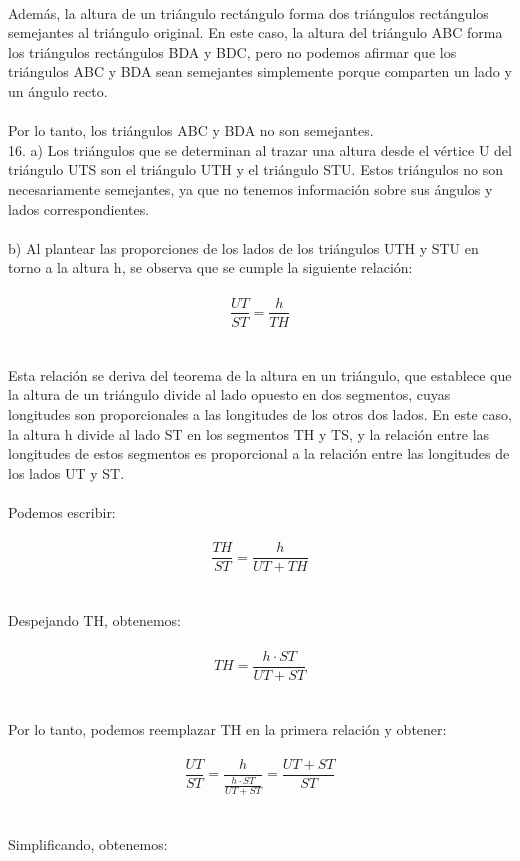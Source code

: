 \documentclass{article}
\begin{document}
\\
Además, la altura de un triángulo rectángulo forma dos triángulos rectángulos semejantes al triángulo original. En este caso, la altura del triángulo ABC forma los triángulos rectángulos BDA y BDC, pero no podemos afirmar que los triángulos ABC y BDA sean semejantes simplemente porque comparten un lado y un ángulo recto.\\
\\
Por lo tanto, los triángulos ABC y BDA no son semejantes.\\
{\Large 16.}
a) Los triángulos que se determinan al trazar una altura desde el vértice U del triángulo UTS son el triángulo UTH y el triángulo STU. Estos triángulos no son necesariamente semejantes, ya que no tenemos información sobre sus ángulos y lados correspondientes.\\
\\
b) Al plantear las proporciones de los lados de los triángulos UTH y STU en torno a la altura h, se observa que se cumple la siguiente relación:\\
\\
$$\frac{UT}{ST} = \frac{h}{TH}$$\\
\\
Esta relación se deriva del teorema de la altura en un triángulo, que establece que la altura de un triángulo divide al lado opuesto en dos segmentos, cuyas longitudes son proporcionales a las longitudes de los otros dos lados. En este caso, la altura h divide al lado ST en los segmentos TH y TS, y la relación entre las longitudes de estos segmentos es proporcional a la relación entre las longitudes de los lados UT y ST.\\
\\
Podemos escribir:\\
\\
$$\frac{TH}{ST} = \frac{h}{UT + TH}$$\\
\\
Despejando TH, obtenemos:\\
\\
$$TH = \frac{h \cdot ST}{UT + ST}$$\\
\\
Por lo tanto, podemos reemplazar TH en la primera relación y obtener:\\
\\
$$\frac{UT}{ST} = \frac{h}{\frac{h \cdot ST}{UT + ST}} = \frac{UT + ST}{ST}$$\\
\\
Simplificando, obtenemos:\\
\end{document}
